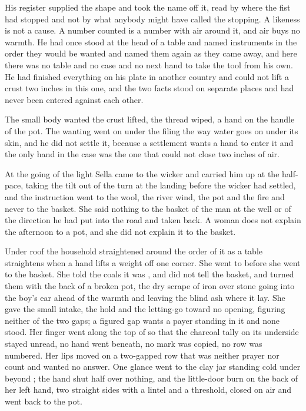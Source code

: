 His register supplied the shape and took the name off it, read by where the fist had stopped and not by what anybody might have called the stopping. A likeness is not a cause. A number counted is a number with air around it, and air buys no warmth. He had once stood at the head of a table and named instruments in the order they would be wanted and named them again as they came away, and here there was no table and no case and no next hand to take the tool from his own. He had finished everything on his plate in another country and could not lift a crust two inches in this one, and the two facts stood on separate places and had never been entered against each other.

The small body wanted the crust lifted, the thread wiped, a hand on the handle of the pot. The wanting went on under the filing the way water goes on under its skin, and he did not settle it, because a settlement wants a hand to enter it and the only hand in the case was the one that could not close two inches of air.

\scenebreak

At the going of the light Sella came to the wicker and carried him up  at the half-pace, taking the tilt out of the turn at the landing before the wicker had settled, and the instruction went to the wool, the river wind, the pot and the fire and never to the basket. She said nothing to the basket of the man at the well or of the direction he had put into the road and taken back. A woman does not explain the afternoon to a pot, and she did not explain it to the basket.

Under  roof the household straightened around the order of it as a table straightens when a hand lifts a weight off one corner. She went to  before she went to the basket. She told the coals it was , and did not tell the basket, and turned them with the back of a broken pot, the dry scrape of iron over stone going into the boy's ear ahead of the warmth and leaving the blind ash where it lay. She gave the small intake, the hold and the letting-go toward no opening, figuring neither of the two gaps; a figured gap wants a payer standing in it and none stood. Her finger went along the top of  so that the charcoal tally on its underside stayed unread, no hand went beneath, no mark was copied, no row was numbered. Her lips moved on a two-gapped row that was neither prayer nor count and wanted no answer. One glance went to the clay jar standing cold under  beyond ; the hand shut half over nothing, and the little-door burn on the back of her left hand, two straight sides with a lintel and a threshold, closed on air and went back to the pot.

